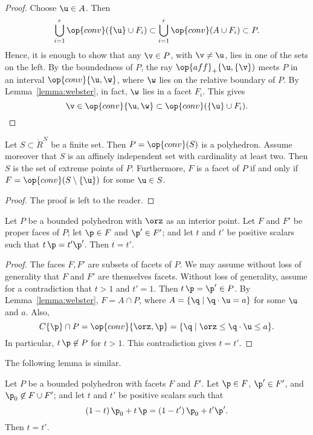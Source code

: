 \begin{proof}
Choose $\u\in A$.   Then
\[ 
\bigcup_{i=1}^r \op{conv}(\{\u\}\cup F_i) \subset \bigcup_{i=1}^r \op{conv}(A\cup F_i)\subset P.
\] 
Hence, it is enough to show that any $\v\in P$, with $\v\ne \u$, 
lies in one of the sets on the left.
By the boundedness of $P$, the ray $\op{aff}_+\{\u,\{\v\})$ meets $P$ in an interval
$\op{conv}\{\u,\w\}$, where $\w$ lies on the relative boundary of $P$.  By Lemma~\ref{lemma:webster}, in fact, $\w$ lies in a facet $F_i$.  This gives
\[ 
 \v\in \op{conv}\{\u,\w\}\subset \op{conv}(\{\u\}\cup F_i).
\] 
\end{proof}


\begin{lemma}[]\label{lemma:simplex-poly}
  Let $S\subset\ring{R}^N$ be a finite set.  Then $P=\op{conv}(S)$ is
  a polyhedron.  Assume moreover that $S$ is an affinely independent
  set with cardinality at least two.  Then $S$ is the set of extreme
  points of $P$. Furthermore,   $F$ is a facet of $P$ if and only if $F =
  \op{conv}(S\setminus \{\u\})$ for some $\u\in S$.
\end{lemma}

\begin{proof} The proof is left to the reader.
\end{proof}

\begin{lemma}[]\cutrate{} \label{lemma:scale} 
Let $P$ be a bounded polyhedron with $\orz$ as an interior point.
Let $F$ and $F'$ be proper faces of $P$; let $\p\in F$ and
$\p'\in F'$; and let  $t$ and $t'$ be  positive scalars such that $t\, \p = t' \p'$.
Then $t=t'$.
\end{lemma}

\begin{proof} The faces $F,F'$ are subsets of facets of $P$.  We may assume
without loss of generality that $F$ and $F'$ are themselves facets.  Without
loss of generality, assume for a contradiction that $t>1$ and $t'=1$.
Then $t\, \p = \p'\in P$.
By Lemma~\ref{lemma:webster}, $F = A \cap P$, where $A= \{\q
\mid \q\cdot \u = a\}$ for some $\u$ and $a$.  Also,
\[ 
C\{\p\}\cap P = \op{conv}\{\orz,\p\} = \{\q \mid \orz\le \q\cdot \u \le a\}.
\] 
In particular, $t\, \p\not\in P$ for $t>1$.  This contradiction gives
$t = t'$.
\end{proof}

The following lemma is similar.

\begin{lemma}[]\cutrate{} \label{lemma:scale2} 
Let $P$ be a bounded polyhedron with facets $F$ and $F'$.
Let $\p\in F$,
$\p'\in F'$, 
and $\p_0\not\in F\cup F'$; and let  $t$ and $t'$ be  positive scalars such that 
\[
(1-t)\, \p_0 + t\, \p = (1-t')\, \p_0 + t' \p'.
\]
Then $t=t'$.
\end{lemma}


